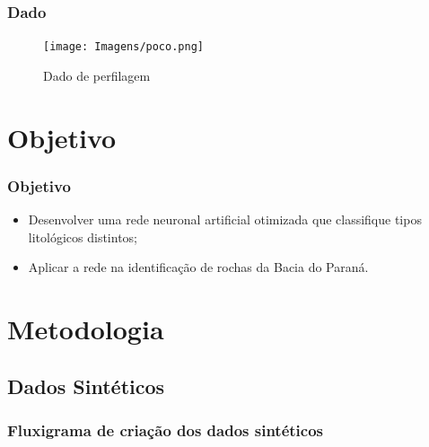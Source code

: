 \documentclass[10pt]{beamer} %
\begin{document}
\begin{frame}
	\frametitle{Dado}
	\begin{figure}[H]
		\centering
		\texttt{[image: Imagens/poco.png]}
		\caption{Dado de perfilagem }
	\end{figure}
\end{frame}

\section{Objetivo}

\begin{frame}
	\frametitle{Objetivo}
	\begin{itemize}
		\item Desenvolver uma rede neuronal artificial otimizada que classifique tipos litológicos distintos;
		\pause
		\item  Aplicar a rede na identificação de rochas da Bacia do Paraná. 
	\end{itemize}
\end{frame}


\section{Metodologia}

\subsection{Dados Sintéticos}
\begin{frame}
	\frametitle{Fluxigrama de criação dos dados sintéticos}
\begin{footnotesize}
	\begin{figure}[H]
		\centering

	\end{figure}
	
\end{footnotesize}	
\end{frame}
\end{document}

